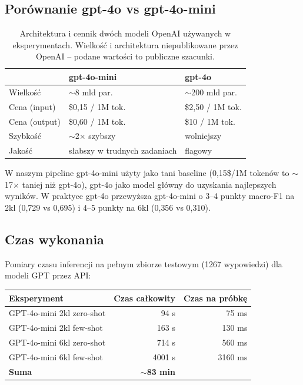 \documentclass[11pt,a4paper]{article}
\begin{document}
\subsection{Porównanie gpt-4o vs gpt-4o-mini}\label{sec:gpt4o_compare}

\begin{table}[h]
\centering
\caption{Architektura i cennik dwóch modeli OpenAI używanych w
eksperymentach. Wielkość i architektura niepublikowane przez OpenAI --
podane wartości to publiczne szacunki.}
\label{tab:gpt4o_vs_mini}
\begin{tabular}{lll}
\toprule
 & \textbf{gpt-4o-mini} & \textbf{gpt-4o} \\
\midrule
Wielkość       & $\sim$8 mld par. & $\sim$200 mld par. \\
Cena (input)   & \$0{,}15 / 1M tok. & \$2{,}50 / 1M tok. \\
Cena (output)  & \$0{,}60 / 1M tok. & \$10 / 1M tok. \\
Szybkość       & $\sim$2$\times$ szybszy & wolniejszy \\
Jakość         & słabszy w trudnych zadaniach & flagowy \\
\bottomrule
\end{tabular}
\end{table}

W naszym pipeline gpt-4o-mini użyty jako tani baseline (0{,}15\$/1M
tokenów to $\sim$17$\times$ taniej niż gpt-4o), gpt-4o jako model główny
do uzyskania najlepszych wyników. W praktyce gpt-4o przewyższa
gpt-4o-mini o 3--4 punkty macro-F1 na 2kl (0{,}729 vs 0{,}695) i
4--5 punkty na 6kl (0{,}356 vs 0{,}310).

\subsection{Czas wykonania}

Pomiary czasu inferencji na pełnym zbiorze testowym (1267 wypowiedzi) dla
modeli GPT przez API:

\begin{center}
\begin{tabular}{lrr}
\toprule
Eksperyment & Czas całkowity & Czas na próbkę \\
\midrule
GPT-4o-mini 2kl zero-shot   &   94 s &   75 ms \\
GPT-4o-mini 2kl few-shot    &  163 s &  130 ms \\
GPT-4o-mini 6kl zero-shot   &  714 s &  560 ms \\
GPT-4o-mini 6kl few-shot    & 4001 s & 3160 ms \\
\midrule
\textbf{Suma}               & \textbf{$\sim$83 min} & \\
\bottomrule
\end{tabular}
\end{center}
\end{document}
